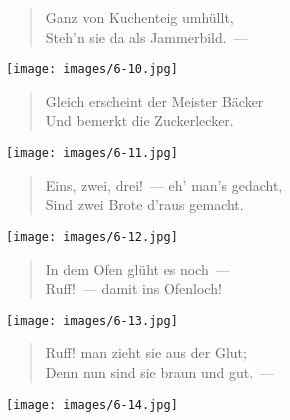 \documentclass[a4paper,12pt]{article}
\begin{document}
\begin{verse}
Ganz von Kuchenteig umhüllt,\\{}
Steh'n sie da als Jammerbild.~—
\end{verse}



\begin{center}\texttt{[image: images/6-10.jpg]}\end{center}



\begin{verse}
Gleich erscheint der Meister Bäcker\\{}
Und bemerkt die Zuckerlecker.
\end{verse}



\begin{center}\texttt{[image: images/6-11.jpg]}\end{center}



\begin{verse}
Eins, zwei, drei!~— eh' man's gedacht,\\{}
Sind zwei Brote d'raus gemacht.
\end{verse}



\begin{center}\texttt{[image: images/6-12.jpg]}\end{center}



\begin{verse}
In dem Ofen glüht es noch~—\\{}
Ruff!~— damit ins Ofenloch!
\end{verse}



\begin{center}\texttt{[image: images/6-13.jpg]}\end{center}



\begin{verse}
Ruff! man zieht sie aus der Glut;\\{}
Denn nun sind sie braun und gut.~—
\end{verse}



\begin{center}\texttt{[image: images/6-14.jpg]}\end{center}
\end{document}
